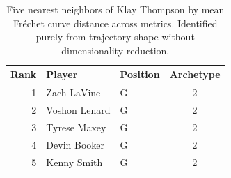 \begin{table}[htbp]
  \centering\small
  \begin{tabular}{rllc}
    \toprule
    Rank & Player & Position & Archetype \\
    \midrule
    1 & Zach LaVine & G & 2 \\
    2 & Voshon Lenard & G & 2 \\
    3 & Tyrese Maxey & G & 2 \\
    4 & Devin Booker & G & 2 \\
    5 & Kenny Smith & G & 2 \\
    \bottomrule
  \end{tabular}
  \caption{Five nearest neighbors of Klay Thompson by mean Fr\'{e}chet curve distance across metrics. Identified purely from trajectory shape without dimensionality reduction.}
  \label{tab:Klay_Thompson_frechet_curve_neighbors}
\end{table}

